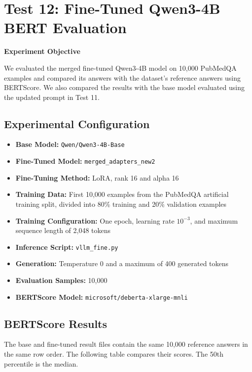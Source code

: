 \newpage
\section{Test 12: Fine-Tuned Qwen3-4B BERT Evaluation}

\noindent\textbf{Experiment Objective}

We evaluated the merged fine-tuned Qwen3-4B model on 10,000 PubMedQA examples and compared its answers with the dataset's reference answers using BERTScore. We also compared the results with the base model evaluated using the updated prompt in Test 11.

\subsection{Experimental Configuration}

\begin{itemize}
    \item \textbf{Base Model:} \texttt{Qwen/Qwen3-4B-Base}
    \item \textbf{Fine-Tuned Model:} \texttt{merged\_adapters\_new2}
    \item \textbf{Fine-Tuning Method:} LoRA, rank 16 and alpha 16
    \item \textbf{Training Data:} First 10,000 examples from the PubMedQA artificial training split, divided into 80\% training and 20\% validation examples
    \item \textbf{Training Configuration:} One epoch, learning rate $10^{-3}$, and maximum sequence length of 2,048 tokens
    \item \textbf{Inference Script:} \texttt{vllm\_fine.py}
    \item \textbf{Generation:} Temperature 0 and a maximum of 400 generated tokens
    \item \textbf{Evaluation Samples:} 10,000
    \item \textbf{BERTScore Model:} \texttt{microsoft/deberta-xlarge-mnli}
\end{itemize}

\subsection{BERTScore Results}

The base and fine-tuned result files contain the same 10,000 reference answers in the same row order. The following table compares their scores. The 50th percentile is the median.

